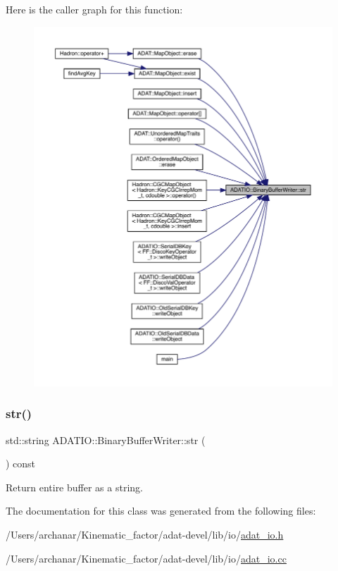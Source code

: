 Here is the caller graph for this function\+:
\nopagebreak
\begin{figure}[H]
\begin{center}
\leavevmode
\includegraphics[width=350pt]{d8/d90/classADATIO_1_1BinaryBufferWriter_a5c4f9b9c049173452e1cc70fe27ee188_icgraph}
\end{center}
\end{figure}
\mbox{\label{classADATIO_1_1BinaryBufferWriter_a5c4f9b9c049173452e1cc70fe27ee188}} 
\subsubsection{\texorpdfstring{str()}{str()}\hspace{0.1cm}{\footnotesize\ttfamily [3/3]}}
{\footnotesize\ttfamily std\+::string A\+D\+A\+T\+I\+O\+::\+Binary\+Buffer\+Writer\+::str (\begin{DoxyParamCaption}{ }\end{DoxyParamCaption}) const}



Return entire buffer as a string. 



The documentation for this class was generated from the following files\+:\begin{DoxyCompactItemize}
\item 
/\+Users/archanar/\+Kinematic\+\_\+factor/adat-\/devel/lib/io/\mbox{\hyperlink{adat-devel_2lib_2io_2adat__io_8h}{adat\+\_\+io.\+h}}\item 
/\+Users/archanar/\+Kinematic\+\_\+factor/adat-\/devel/lib/io/\mbox{\hyperlink{adat-devel_2lib_2io_2adat__io_8cc}{adat\+\_\+io.\+cc}}\end{DoxyCompactItemize}
